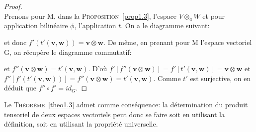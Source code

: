 \documentclass[11pt,a4paper,oneside]{book}
\newtheorem{proof}{Démonstration}
\def\v{\mathbf v}
\def\w{\mathbf w}
\newcommand{\propref}[1]{\textsc{Proposition}~\ref{#1}}
\newcommand{\theoref}[1]{\textsc{Théorème}~\ref{#1}}
\begin{document}
\begin{proof}
	\emph{\\}
	Prenons pour M, dans la \propref{prop1.3}, l'espace $ V\otimes_{a} W $ et pour application bilinéaire $ \phi $, l'application $ t $. On a le diagramme suivant:
	\begin{center}
	\end{center}
	et donc $ f'(t'(\v,\w))=\v\otimes \w $. De même, en prenant pour M l'espace vectoriel G, on récupère le diagramme commutatif:
		\begin{center}
	\end{center}
	et $ f''(\v\otimes \w)=t'(\v,\w) $. D'où $ f'[f''(\v\otimes \w)]=f'[t'(\v,\w)]=\v\otimes \w $ et $ f''[f'(t'(\v,\w))]=f''(\v\otimes \w)=t'(\v,\w) $. Comme $ t' $ est surjective, on en déduit que $ f''\circ f'=id_{G} $.
\end{proof}
Le \theoref{theo1.3} admet comme conséquence: la détermination du produit tensoriel de deux espaces vectoriels peut donc se faire soit en utilisant la définition, soit en utilisant la propriété universelle.
\end{document}
